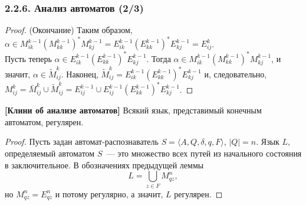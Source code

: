 \documentclass[mathserif,12pt,aspectratio=169]{beamer}
\def\NB#1{{\bf\color{brown}#1}}
\begin{document}
\begin{frame}
\frametitle{2.2.6. Анализ автоматов (2/3)}
\begin{proof} (Окончание)
Таким образом, \\$\alpha\in
M^{k-1}_{ik}(M^{k-1}_{kk})^* M_{kj}^{k-1} =
E_{ik}^{k-1}(E^{k-1}_{kk})^* E^{k-1}_{kj} = E^k_{ij}$. \\Пусть теперь
$\alpha \in E^{k-1}_{ik}(E^{k-1}_{kk})^* E_{kj}^{k-1}$. Тогда
$\alpha\in M^{k-1}_{ik}(M^{k-1}_{kk})^* M^{k-1}_{kj}$,  и значит,
$\alpha\in \tilde{M}^k_{ij}$. 
Наконец, $\tilde{M}_{ij}^k =
E^{k-1}_{ik}(E^{k-1}_{kk})^* E^{k-1}_{kj}$ и, следовательно,\\
$M_{ij}^k = \bar{M}^k_{ij}\cup \tilde{M}^k_{ij} = E^{k-1}_{ij}\cup
E^{k-1}_{ij}(E^{k-1}_{kk})^* E_{kj}^{k-1}$.
\end{proof}
\begin{theorem}
\NB{[Клини об анализе автоматов]}
Всякий язык, представимый конечным автоматом, регулярен.
\end{theorem}

\begin{proof}
Пусть задан автомат-распознаватель $S=\langle A, Q, \delta, q,
F\rangle$,  $|Q|=n$. Язык $L$, определяемый автоматом $S$~--- это
множество всех путей из начального состояния в заключительное. В
обозначениях предыдущей леммы
$$
L=\bigcup_{z\in F}M^n_{qz},
$$
но $M_{qz}^n= E^n_{qz}$ и потому регулярно, а значит, $L$
регулярен.
\end{proof}
\end{frame}
\end{document}
